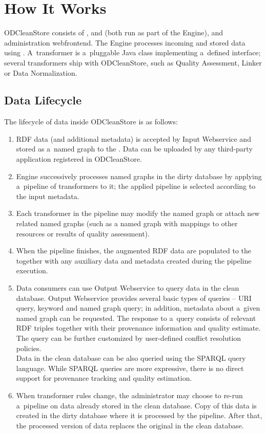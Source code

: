 \chapter{How It Works}
\label{chap:howItWorks}

ODCleanStore consists of ,  and  (both run as part of the Engine), and administration webfrontend. The Engine processes incoming and stored data using . A~transformer is a~pluggable Java class implementing a~defined interface; several transformers ship with ODCleanStore, such as Quality Assessment, Linker or Data Normalization.


\section{Data Lifecycle}

The lifecycle of data inside ODCleanStore is as follows:

\begin{enumerate}
  \item RDF data (and additional metadata) is accepted by Input Webservice and stored as a~named graph to the . Data can be uploaded by any third-party application registered in ODCleanStore.
  \item Engine successively processes named graphs in the dirty database by applying a~pipeline of transformers to it; the applied pipeline is selected according to the input metadata.
  \item Each transformer in the pipeline may modify the named graph or attach new related named graphs (such as a named graph with mappings to other resources or results of quality assessment).
  \item When the pipeline finishes, the augmented RDF data are populated to the  together with any auxiliary data and metadata created during the pipeline execution.
  \item Data consumers can use Output Webservice to query data in the clean database. Output Webservice provides several basic types of queries -- URI query, keyword and named graph query; in addition, metadata about a~given named graph can be requested. The response to a~query consists of relevant RDF triples together with their provenance information and quality estimate. The query can be further customized by user-defined conflict resolution policies.\\
	Data in the clean database can be also queried using the SPARQL query language. While SPARQL queries are more expressive, there is no direct support for provenance tracking and quality estimation. 
  \item When transformer rules change, the administrator may choose to re-run a~pipeline on data already stored in the clean database. Copy of this data is created in the dirty database where it is processed by the pipeline. After that, the processed version of data replaces the original in the clean database.
\end{enumerate}

